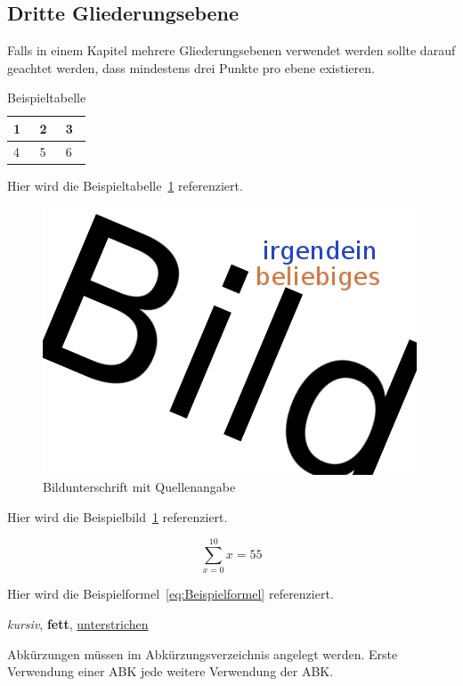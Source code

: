 \subsection{Dritte Gliederungsebene}
Falls in einem Kapitel mehrere Gliederungsebenen verwendet werden sollte darauf geachtet werden, dass mindestens drei Punkte pro ebene existieren. 

\begin{table}[h]
	\centering
	\begin{tabular}{|l|l|l|}
		\hline
		1&2&3\\\hline
		4&5&6\\\hline
	\end{tabular}
	\caption{Beispieltabelle}
	\label{Tab:Beispieltabelle}
\end{table}

Hier wird die Beispieltabelle~\ref{Tab:Beispieltabelle} referenziert.

\begin{figure}[h] %
	\centering
	\includegraphics[scale=.25]{abbildungen/bild1}
	\caption[Bildunterschrift mit Quellenangabe]{Bildunterschrift mit Quellenangabe \cite{lcd}}
	\label{Fig:Bildbezeichnung}
\end{figure}

Hier wird die Beispielbild~\ref{Fig:Bildbezeichnung} referenziert.

\begin{equation} \label{eq:Beispielformel}
	\sum_{x=0}^{10}x=55
\end{equation}

Hier wird die Beispielformel~\ref{eq:Beispielformel} referenziert.

\textit{kursiv}, \textbf{fett}, \underline{unterstrichen}

Abkürzungen müssen im Abkürzungsverzeichnis angelegt werden.
Erste Verwendung einer \ac{ABK} jede weitere Verwendung der \ac{ABK}.

\nocite{*}

